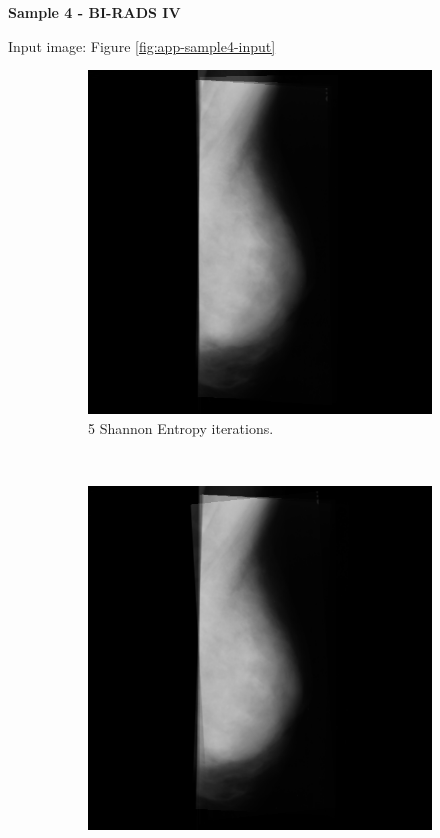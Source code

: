 \newpage \noindent \textbf{Sample 4 - BI-RADS IV}

Input image: Figure \ref{fig:app-sample4-input}

\begin{figure}[H]
    \centering
    \begin{subfigure}[t]{0.3\textwidth}
        \includegraphics[width=\textwidth]{Appendix5/sample4/shannon/shannon_5.png}
        \caption{5 Shannon Entropy iterations.}
        \label{fig:app-5-shannon-sample4}
    \end{subfigure} \hfill
    ~ %
    \begin{subfigure}[t]{0.3\textwidth}
        \includegraphics[width=\textwidth]{Appendix5/sample4/shannon/shannon_10.png}

\end{subfigure}
\end{figure}
